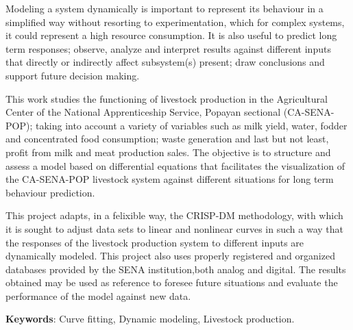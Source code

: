 


Modeling a system dynamically is important to represent its behaviour in a simplified way without resorting to experimentation, which for complex systems, it could represent a high resource consumption. It is also useful to predict long term responses; observe, analyze and interpret results against different inputs that directly or indirectly affect subsystem(s) present; draw conclusions and support future decision making.

This work studies the functioning of livestock production in the Agricultural Center of the National Apprenticeship Service, Popayan sectional (CA-SENA-POP); taking into account a variety of variables such as milk yield, water, fodder and concentrated food consumption; waste generation and last but not least, profit from milk and meat production sales. The objective is to structure and assess a model based on differential equations that facilitates the visualization of the CA-SENA-POP livestock system against different situations for long term behaviour prediction.

This project adapts, in a felixible way, the CRISP-DM methodology, with which it is sought to adjust
data sets to linear and nonlinear curves in such a way that the responses of the livestock production system to different inputs are dynamically modeled. This project also uses properly registered and organized databases provided by the SENA institution,both analog and digital.
The results obtained may be used as reference to foresee future situations and evaluate the performance of the model against new data.


{\bf Keywords}: Curve fitting, Dynamic modeling, Livestock production.

\cleardoublepage
